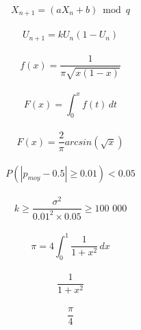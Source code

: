 \documentclass[14pt]{extarticle}
\begin{document}
    \[X_{n+1} = (a X_n + b) \bmod q\]\\
    \vspace{1cm}
    \[U_{n+1} = kU_n(1-U_n)\]\\
    \vspace{1cm}
    \[f(x) = \frac{1}{\pi\sqrt{x(1-x)}}\]\\
    \vspace{1cm}
    \[F(x) = \int_{0}^{x}{f(t)\,dt}\]\\
    \vspace{1cm}
    \[F(x) = \frac{2}{\pi}arcsin(\sqrt{x})\]\\
    \vspace{1cm}
    \[P(|p_{moy} - 0.5| \geqslant 0.01) < 0.05\]\\
    \vspace{1cm}
    \[k \geqslant \frac{\sigma^2}{0.01^2 \times 0.05} \geqslant \text{100 000}\]\\
    \vspace{1cm}
    \[\pi = 4 \int_{0}^{1}{\frac{1}{1+x^2}\,dx}\]\\
    \vspace{1cm}
    \[\frac{1}{1+x^2}\]\\
    \vspace{1cm}
    \[\frac{\pi}{4}\]
\end{document}
